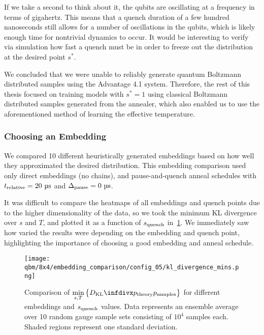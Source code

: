 If we take a second to think about it, the qubits are oscillating at a frequency in terms of gigahertz.
This means that a quench duration of a few hundred nanoseconds still allows for a number of oscillations in the qubits, which is likely enough time for nontrivial dynamics to occur.
It would be interesting to verify via simulation how fast a quench must be in order to freeze out the distribution at the desired point \( s^* \).

We concluded that we were unable to reliably generate quantum Boltzmann distributed samples using the Advantage 4.1 system.
Therefore, the rest of this thesis focused on training models with \( s^* = 1 \) using classical Boltzmann distributed samples generated from the annealer, which also enabled us to use the aforementioned method of learning the effective temperature.

\subsubsection{Choosing an Embedding}
We compared 10 different heuristically generated embeddings based on how well they approximated the desired distribution.
This embedding comparison used only direct embeddings (no chains), and pause-and-quench anneal schedules with \( \trelative = 20 \ \si{\micro\second} \) and \( \Delta_{\text{pause}} = 0 \ \si{\micro\second} \).

It was difficult to compare the heatmaps of all embeddings and quench points due to the higher dimensionality of the data, so we took the minimum KL divergence over \( s \) and \( T \), and plotted it as a function of \( s_{\text{quench}} \) in~\cref{fig:dkl_mins_embeddings}.
We immediately saw how varied the results were depending on the embedding and quench point, highlighting the importance of choosing a good embedding and anneal schedule.

\begin{figure}[!htb]
    \begin{center}
        \texttt{[image: qbm/8x4/embedding\_comparison/config\_05/kl\_divergence\_mins.png]}
    \end{center}
    \caption{
        Comparison of \( \min\limits_{s,T}\big\{\DKL{\ptheory}{\psamples}\big\} \) for different embeddings and \( s_{\text{quench}} \) values.
        Data represents an ensemble average over 10 random gauge sample sets consisting of \( 10^4 \) samples each.
        Shaded regions represent one standard deviation.
    }
    \label{fig:dkl_mins_embeddings}
\end{figure}

